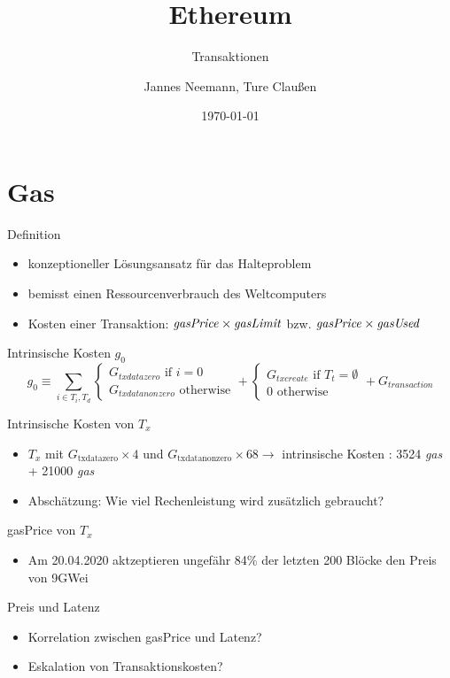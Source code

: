 \documentclass{f4_beamer}
\title{Ethereum}
\subtitle{Transaktionen}
\author{Jannes Neemann, Ture Claußen}
\date{\today}
\begin{document}
\section{Gas}
\begin{frame}{Definition}
\begin{itemize}
  \item konzeptioneller Lösungsansatz für das Halteproblem
  \item bemisst einen Ressourcenverbrauch des Weltcomputers
  \item Kosten einer Transaktion: $ \text{\textit{gasPrice}} \times \text{\textit{gasLimit}} $ bzw. $ \text{\textit{gasPrice}} \times \text{\textit{gasUsed}} $ 
\end{itemize}
\end{frame}


\begin{frame}{Intrinsische Kosten $g_0$}
  $$ g_0 \equiv \sum_{i \in T_i, T_d}
  \begin{cases}
    G_{txdatazero} \text{ if } i=0 \\
    G_{txdatanonzero} \text{ otherwise}
  \end{cases}
  +
  \begin{cases}
    G_{txcreate} \text{ if } T_t = \emptyset \\
    0 \text{ otherwise}
  \end{cases}
  +
  G_{transaction}
$$
\end{frame}

\begin{frame}{Intrinsische Kosten von $T_x$}
  \begin{itemize}
  \item $ T_x $ mit $ G_{\text{txdatazero}} \times 4 $ und $ G_{\text{txdatanonzero}} \times 68 \rightarrow $ intrinsische Kosten : 3524 \textit{gas} + 21000 \textit{gas}
  \item Abschätzung: Wie viel Rechenleistung wird zusätzlich gebraucht?
  \end{itemize}
\end{frame}

\begin{frame}{gasPrice von $T_x$}
  \begin{itemize}
  \item Am 20.04.2020 aktzeptieren ungefähr 84\% der letzten 200 Blöcke den Preis von 9GWei
  \end{itemize}
\end{frame}

\begin{frame}{Preis und Latenz}
  \begin{itemize}
  \item Korrelation zwischen gasPrice und Latenz?
  \item Eskalation von Transaktionskosten?
\end{itemize}
\end{frame}
\end{document}
